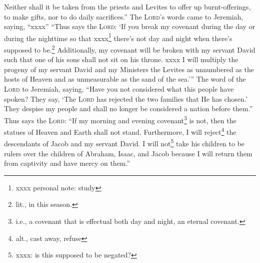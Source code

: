 \begin{inparaenum}
     Neither shall it be taken from the priests and Levites to offer up burnt-offerings, to make gifts, nor to do daily sacrifices.''%
     The \textsc{Lord}'s words came to Jeremiah, saying, ``xxxx''%
     ``Thus says the \textsc{Lord}: `If you break my covenant during the day or during the nighttime so that xxxx\footnote{xxxx personal note: study } there's not day and night when there's supposed to be.\footnote{lit., in this season.}%
     Additionally, my covenant will be broken with my servant David such that one of his sons shall not sit on his throne. xxxx%
     I will multiply the progeny of my servant David and my Ministers the Levites as unnumbered as the hosts of Heaven and as unmeasurable as the sand of the sea.'\thinspace''%
     The word of the \textsc{Lord} to Jeremiah, saying,%
     ``Have you not considered what this people have spoken? They say, `The \textsc{Lord} has rejected the two families that He has chosen.' They despise my people and shall no longer be considered a nation before them.''%
     Thus says the \textsc{Lord}: ``If my morning and evening covenant\footnote{i.e., a covenant that is effectual both day and night, an eternal covenant.} is not, then the statues of Heaven and Earth shall not stand.%
     Furthermore, I will reject\footnote{alt., cast away, refuse} the descendants of Jacob and my servant David. I will not\footnote{xxxx: is this supposed to be negated?} take his children to be rulers over the children of Abraham, Isaac, and Jacob because I will return them from captivity and have mercy on them.''%
\end{inparaenum}
